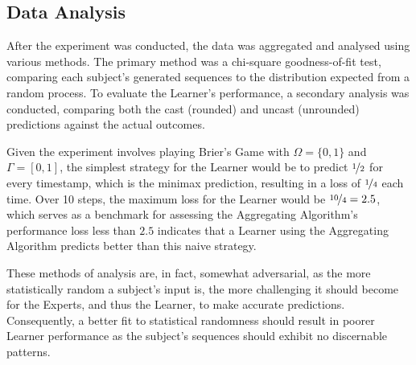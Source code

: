 \subsection{Data Analysis}
After the experiment was conducted, the data was aggregated and analysed using various methods. The primary method was a chi-square goodness-of-fit test, comparing each subject's generated sequences to the distribution expected from a random process. To evaluate the Learner's performance, a secondary analysis was conducted, comparing both the cast (rounded) and uncast (unrounded) predictions against the actual outcomes.

Given the experiment involves playing Brier's Game with $\Omega = \{0, 1\}$ and $\Gamma = [0, 1]$, the simplest strategy for the Learner would be to predict $\nicefrac{1}{2}$ for every timestamp, which is the minimax prediction, resulting in a loss of $\nicefrac{1}{4}$ each time. Over 10 steps, the maximum loss for the Learner would be $\nicefrac{10}{4} = 2.5$, which serves as a benchmark for assessing the Aggregating Algorithm's performance \textendash{} loss less than $2.5$ indicates that a Learner using the Aggregating Algorithm predicts better than this naive strategy.

These methods of analysis are, in fact, somewhat adversarial, as the more statistically random a subject's input is, the more challenging it should become for the Experts, and thus the Learner, to make accurate predictions. Consequently, a better fit to statistical randomness should result in poorer Learner performance as the subject's sequences should exhibit no discernable patterns.

